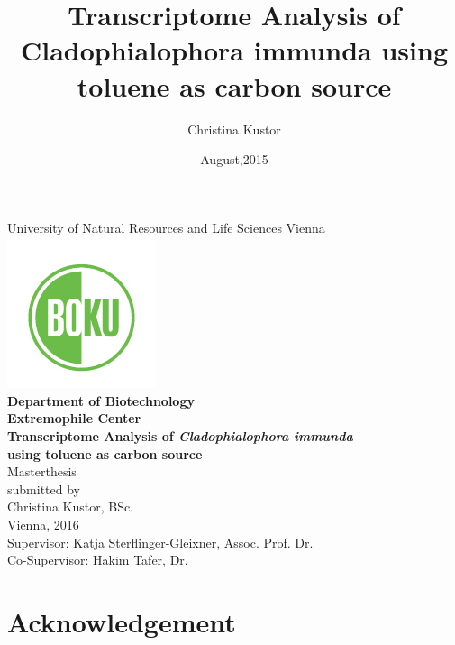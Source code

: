 \documentclass[12pt, a4paper]{report}
\title{Transcriptome Analysis of Cladophialophora immunda using toluene as carbon source}
\author{Christina Kustor}
\date{August,2015}
\begin{document}
\newpage
\begin{center}
\large {University of Natural Resources and Life Sciences Vienna\\
\includegraphics{pics/boku_logo}\\
\bigskip
\textbf{Department of Biotechnology\\
Extremophile Center}}\\
\vspace*{1cm}
\LARGE\textbf{Transcriptome Analysis of 
\textit{Cladophialophora immunda} \\using toluene as carbon source}\\
\vspace*{0,5cm}
\large {Masterthesis\\
\vspace*{1,5cm}
submitted by\\
Christina Kustor, BSc.\\
Vienna, 2016\\
\vspace*{1cm}
Supervisor: Katja Sterflinger-Gleixner, Assoc. Prof. Dr.\\
Co-Supervisor: Hakim Tafer, Dr.\\}
\end{center}

\newpage
\section*{Acknowledgement}
\newpage
{}
\end{document}
